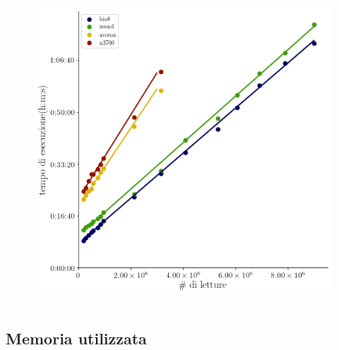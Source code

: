 \documentclass{beamer}
\begin{document}
\begin{frame}
\begin{columns}
\begin{column}{0.8\linewidth}	
\begin{figure}[H]
\centering
\includegraphics[scale=0.43]{Tempi_complessivi.png}
\label{subfig:SP}
\end{figure}
\end{column}
\end{columns}
\end{frame}


\subsection{Memoria utilizzata}

\end{document}
